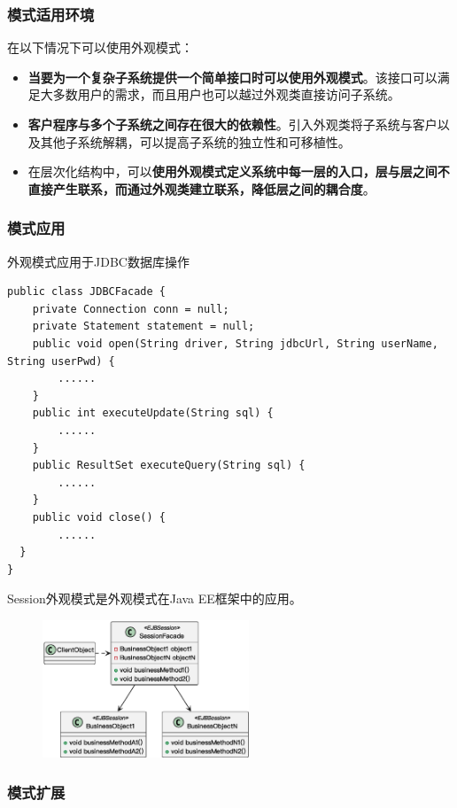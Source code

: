 \subsubsection{模式适用环境}
在以下情况下可以使用外观模式：
\begin{itemize}
    \item \textbf{当要为一个复杂子系统提供一个简单接口时可以使用外观模式}。该接口可以满足大多数用户的需求，而且用户也可以越过外观类直接访问子系统。
    \item \textbf{客户程序与多个子系统之间存在很大的依赖性}。引入外观类将子系统与客户以及其他子系统解耦，可以提高子系统的独立性和可移植性。
    \item 在层次化结构中，可以\textbf{使用外观模式定义系统中每一层的入口，层与层之间不直接产生联系，而通过外观类建立联系，降低层之间的耦合度}。
\end{itemize}

\subsubsection{模式应用}
 外观模式应用于JDBC数据库操作
\begin{lstlisting}
public class JDBCFacade {
    private Connection conn = null;
    private Statement statement = null;
    public void open(String driver, String jdbcUrl, String userName, String userPwd) {
        ......
    }
    public int executeUpdate(String sql) {
        ......
    }
    public ResultSet executeQuery(String sql) {
        ......
    }
    public void close() {
        ......
  }
}
\end{lstlisting}

 Session外观模式是外观模式在Java EE框架中的应用。
\begin{figure}[H]
    \vspace{-0.5em}
	\centering
	\includegraphics[width=0.55\textwidth]{images/外观模式应用.eps}
    \vspace{-1em}
\end{figure}

\subsubsection{模式扩展}
